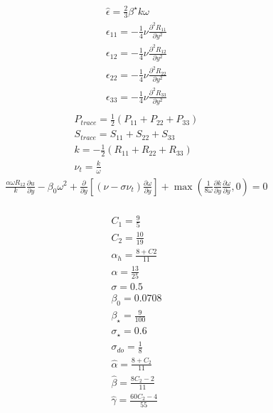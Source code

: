 \documentclass[%
notitlepage,
]{revtex4-1}
\newcommand{\pd}[2]{\frac{\partial #1}{\partial #2}}
\begin{document}
\begin{eqnarray}
  \hat{\epsilon} = \frac{2}{3}\beta^{\star}k \omega\\
  \epsilon_{11} = -\frac{1}{4}\nu \pd{^{2}R_{11}}{y^2}\\ 
  \epsilon_{12} = -\frac{1}{4}\nu \pd{^{2}R_{12}}{y^2}\\ 
  \epsilon_{22} = -\frac{1}{4}\nu \pd{^{2}R_{22}}{y^2}\\ 
  \epsilon_{33} = -\frac{1}{4}\nu \pd{^{2}R_{33}}{y^2}\\ 
\end{eqnarray}
\begin{eqnarray}
  P_{trace} = \frac{1}{2}(P_{11} + P_{22} + P_{33})\\
  S_{trace} = S_{11} + S_{22} + S_{33}\\
  k = -\frac{1}{2}\left(R_{11} + R_{22} + R_{33}\right)\\
  \nu_t = \frac{k}{\omega}
\end{eqnarray}
\begin{eqnarray}
\frac{\alpha \omega R_{12}}{k}\pd{u}{y} - \beta_{0}\omega^2 +\pd{}{y}\left[\left(\nu - \sigma\nu_t\right)\pd{\omega}{y}\right] + \max\left(\frac{1}{8\omega}\pd{k}{y}\pd{\omega}{y}, 0\right) = 0 \\
\end{eqnarray}

\begin{eqnarray}
    C_1 = \frac{9}{5}\\
    C_2 = \frac{10}{19}\\
    \alpha_h = \frac{8 + C2}{11}\\
    \alpha = \frac{13}{25}\\
    \sigma = 0.5\\
    \beta_0 = 0.0708\\
    \beta_\star = \frac{9}{100}\\
    \sigma_\star = 0.6\\
    \sigma_{do} = \frac{1}{8}\\
    \hat{\alpha} = \frac{8 + C_2}{11}\\
    \hat{\beta} = \frac{8C_2 - 2}{11}\\
    \hat{\gamma} = \frac{60C_2 - 4}{55}\\
\end{eqnarray}
\end{document}
